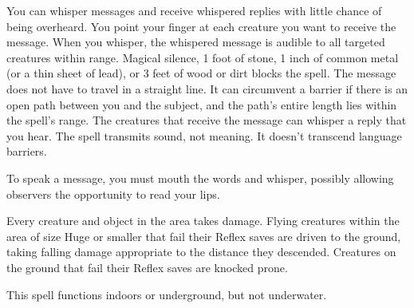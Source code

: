 \spellrng{\rngmed}
\spelldur{\durlong}
\begin{spelleffect}
  You can whisper messages and receive whispered replies with little chance of being overheard. You point your finger at each creature you want to receive the message. When you whisper, the whispered message is audible to all targeted creatures within range. Magical silence, 1 foot of stone, 1 inch of common metal (or a thin sheet of lead), or 3 feet of wood or dirt blocks the spell. The message does not have to travel in a straight line. It can circumvent a barrier if there is an open path between you and the subject, and the path's entire length lies within the spell's range. The creatures that receive the message can whisper a reply that you hear. The spell transmits sound, not meaning. It doesn't transcend language barriers.
\end{spelleffect}
\begin{spellnotes}
  To speak a message, you must mouth the words and whisper, possibly allowing observers the opportunity to read your lips.
\end{spellnotes}

\spellrng{\rngfar}
\begin{spelleffect}
  Every creature and object in the area takes damage. Flying creatures within the area of size Huge or smaller that fail their Reflex saves are driven to the ground, taking falling damage appropriate to the distance they descended. Creatures on the ground that fail their Reflex saves are knocked prone.
\end{spelleffect}
\begin{spellnotes}
  This spell functions indoors or underground, but not underwater.
\end{spellnotes}

